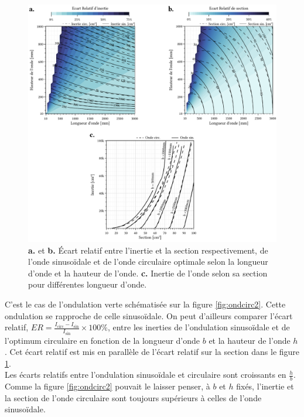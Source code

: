 \documentclass[11pt,titlepage]{article}
\begin{document}
\begin{figure}[H]
    \centering
    \includegraphics[width=\linewidth]{img/ondul/section_circ.pdf}
    \caption{\textbf{a.} et \textbf{b.} Écart relatif entre l'inertie et la section respectivement, de l'onde sinusoïdale et de l'onde circulaire optimale selon la longueur d'onde et la hauteur de l'onde. \textbf{c.} Inertie de l'onde selon sa section pour différentes longueur d'onde.}
    \label{fig:ERcirc}
\end{figure}
C'est le cas de l'ondulation verte schématisée sur la figure \ref{fig:ondcirc2}. Cette ondulation se rapproche de celle sinusoïdale. On peut d'ailleurs comparer l'écart relatif, $ER = \frac{I_{\text{circ}}-I_{\text{sin}}}{I_{\text{sin}}}\times 100\%$, entre les inerties de l'ondulation sinusoïdale et de l'optimum circulaire en fonction de la longueur d'onde $b$ et la hauteur de l'onde $h$. Cet écart relatif est mis en parallèle de l'écart relatif sur la section dans le figure \ref{fig:ERcirc}.
\\

Les écarts relatifs entre l'ondulation sinusoïdale et circulaire sont croissants en $\frac{h}{b}$. Comme la figure \ref{fig:ondcirc2} pouvait le laisser penser, à $b$ et $h$ fixés, l'inertie et la section de l'onde circulaire sont toujours supérieurs à celles de l'onde sinusoïdale. 
\\
\end{document}
